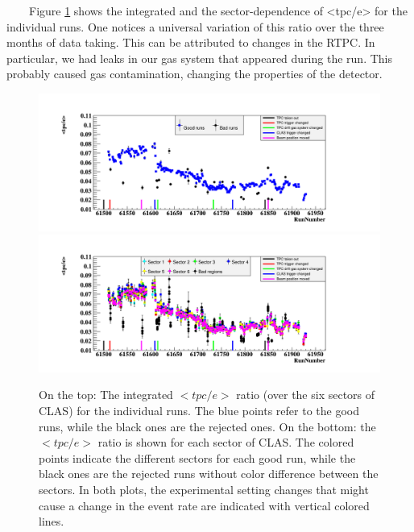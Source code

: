 ~~~~Figure \ref{fig:tpc_over_e_Run_sec.png} shows the integrated and the 
sector-dependence of <tpc/e> for the individual runs. One notices a universal 
variation of this ratio over the three months of data taking. This can be 
attributed to changes in the RTPC. In particular, we had leaks in our gas 
system that appeared during the run. This probably caused gas contamination, 
changing the properties of the detector.



\begin{figure}[h!]
\hspace*{-0.3in}\includegraphics[scale=0.45]{fig_dvcs/tpc_over_e_Run.png}
\hspace*{-0.3in}\includegraphics[scale=0.45]{fig_dvcs/tpc_over_e_Run_sec.png}
\caption{On the top: The integrated $<tpc/e>$ ratio (over the six sectors of CLAS) for the individual runs. The blue points refer to the good runs, while the black ones are the rejected ones. On the bottom: the $<tpc/e>$ ratio is shown for each sector of CLAS. The colored points indicate the different sectors for each good run, while the black ones are the rejected runs without color difference between the sectors. In both plots, the experimental setting changes that might cause a change in the event rate are indicated with vertical colored lines.} 
\label{fig:tpc_over_e_Run_sec.png}
\end{figure}

